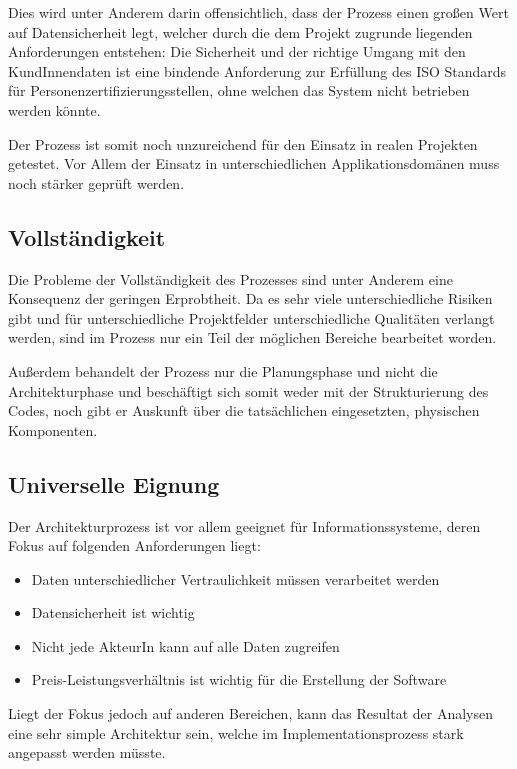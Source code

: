 Dies wird unter Anderem darin offensichtlich, dass der Prozess einen großen Wert auf Datensicherheit legt, welcher durch die dem Projekt zugrunde liegenden Anforderungen entstehen: Die Sicherheit und der richtige Umgang mit den KundInnendaten ist eine bindende Anforderung zur Erfüllung des ISO Standards für Personenzertifizierungsstellen, ohne welchen das System nicht betrieben werden könnte. \cite{ISO_CERT}

Der Prozess ist somit noch unzureichend für den Einsatz in realen Projekten getestet. Vor Allem der Einsatz in unterschiedlichen Applikationsdomänen muss noch stärker geprüft werden.

\subsection{Vollständigkeit}
Die Probleme der Vollständigkeit des Prozesses sind unter Anderem eine Konsequenz der geringen Erprobtheit. Da es sehr viele unterschiedliche Risiken gibt und für unterschiedliche Projektfelder unterschiedliche Qualitäten verlangt werden, sind im Prozess nur ein Teil der möglichen Bereiche bearbeitet worden.

Außerdem behandelt der Prozess nur die Planungsphase und nicht die Architekturphase und beschäftigt sich somit weder mit der Strukturierung des Codes, noch gibt er Auskunft über die tatsächlichen eingesetzten, physischen Komponenten.


\subsection{Universelle Eignung}
Der Architekturprozess ist vor allem geeignet für Informationssysteme, deren Fokus auf folgenden Anforderungen liegt:

\begin{itemize}
  \item Daten unterschiedlicher Vertraulichkeit müssen verarbeitet werden
  \item Datensicherheit ist wichtig
  \item Nicht jede AkteurIn kann auf alle Daten zugreifen
  \item Preis-Leistungsverhältnis ist wichtig für die Erstellung der Software
\end{itemize}

Liegt der Fokus jedoch auf anderen Bereichen, kann das Resultat der Analysen eine sehr simple Architektur sein, welche im Implementationsprozess stark angepasst werden müsste.

